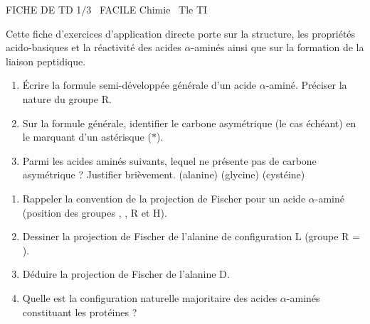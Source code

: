 \documentclass[11pt]{article}
\begin{document}
\begin{tcolorbox}[enhanced,colback=popink,colframe=popink,arc=10pt,boxrule=0pt,left=12pt,right=12pt,top=9pt,bottom=9pt]
{\color{white}\popxbold\small FICHE DE TD 1/3 \textbullet\ FACILE \hfill Chimie \textbullet\ Tle TI\par}
\end{tcolorbox}
\vspace{4pt}
\noindent Cette fiche d'exercices d'application directe porte sur la structure, les propriétés acido-basiques et la réactivité des acides $\alpha$-aminés ainsi que sur la formation de la liaison peptidique.

\begin{exercice}
\begin{enumerate}
    \item Écrire la formule semi-développée générale d'un acide $\alpha$-aminé. Préciser la nature du groupe R.
    \item Sur la formule générale, identifier le carbone asymétrique (le cas échéant) en le marquant d'un astérisque ($*$).
    \item Parmi les acides aminés suivants, lequel ne présente pas de carbone asymétrique ? Justifier brièvement.
     (alanine) \quad {} (glycine) \quad {} (cystéine)
\end{enumerate}
\end{exercice}

\begin{exercice}
\begin{enumerate}
    \item Rappeler la convention de la projection de Fischer pour un acide $\alpha$-aminé (position des groupes , , R et H).
    \item Dessiner la projection de Fischer de l'alanine de configuration L (groupe R = ).
    \item Déduire la projection de Fischer de l'alanine D.
    \item Quelle est la configuration naturelle majoritaire des acides $\alpha$-aminés constituant les protéines ?
\end{enumerate}
\end{exercice}
\end{document}
